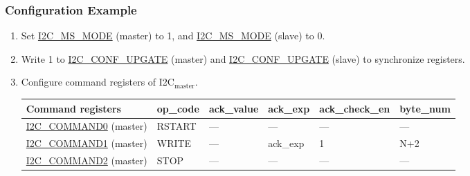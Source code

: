\documentclass[main\_\_EN.tex]{subfiles}
\begin{document}
\subsubsection{Configuration Example}
\begin{enumerate}
\item Set \hyperref[fielddesc:I2CMSMODE]{I2C\_MS\_MODE} (master) to 1, and \hyperref[fielddesc:I2CMSMODE]{I2C\_MS\_MODE} (slave) to 0.
\item Write 1 to \hyperref[fielddesc:I2CCONFUPGATE]{I2C\_CONF\_UPGATE} (master) and \hyperref[fielddesc:I2CCONFUPGATE]{I2C\_CONF\_UPGATE} (slave) to synchronize registers.
\item Configure command registers of I2C$_\text{master}$.

\begin{longtable}{ | p{4.5cm} | p{1.8cm} | p{1.8cm} | p{1.8cm} |p{2.2cm} | p{1.8cm} |}
\hline\rowcolor{lightgray}
Command registers& op\_code & ack\_value&ack\_exp&ack\_check\_en&byte\_num  \\ \hline
\hyperref[fielddesc:I2CCOMMAND0]{I2C\_COMMAND0} (master)& RSTART& ---&---&---&---  \\ \hline
\hyperref[fielddesc:I2CCOMMAND1]{I2C\_COMMAND1} (master)& WRITE& ---&ack\_exp&1&N+2  \\ \hline
\hyperref[fielddesc:I2CCOMMAND2]{I2C\_COMMAND2} (master)& STOP& ---&---&---&---  \\ \hline
\end{longtable}


\end{enumerate}
\end{document}
